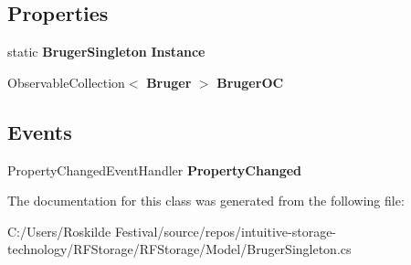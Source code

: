 \subsection*{Properties}
\begin{DoxyCompactItemize}
\item 
\mbox{\label{class_r_f_storage_1_1_model_1_1_bruger_singleton_a433d2f488b22e1e8cf45da3ba2ed39c7}} 
static \textbf{ Bruger\+Singleton} {\bfseries Instance}\hspace{0.3cm}{\ttfamily  [get]}
\item 
\mbox{\label{class_r_f_storage_1_1_model_1_1_bruger_singleton_aaf938004bbed044441731deb68d0a9bb}} 
Observable\+Collection$<$ \textbf{ Bruger} $>$ {\bfseries Bruger\+OC}\hspace{0.3cm}{\ttfamily  [get, set]}
\end{DoxyCompactItemize}
\subsection*{Events}
\begin{DoxyCompactItemize}
\item 
\mbox{\label{class_r_f_storage_1_1_model_1_1_bruger_singleton_a768540634c1ff9e5637a0943024c829a}} 
Property\+Changed\+Event\+Handler {\bfseries Property\+Changed}
\end{DoxyCompactItemize}


The documentation for this class was generated from the following file\+:\begin{DoxyCompactItemize}
\item 
C\+:/\+Users/\+Roskilde Festival/source/repos/intuitive-\/storage-\/technology/\+R\+F\+Storage/\+R\+F\+Storage/\+Model/Bruger\+Singleton.\+cs\end{DoxyCompactItemize}
